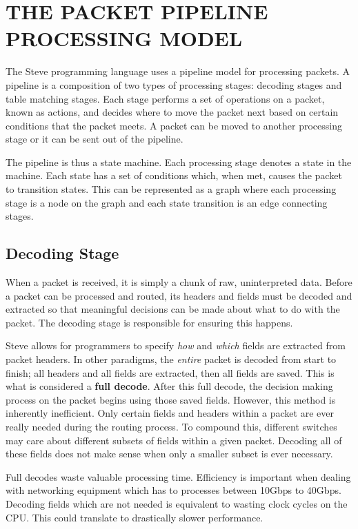 \chapter{THE PACKET PIPELINE PROCESSING MODEL} \label{pipeline_model}

The Steve programming language uses a pipeline model for processing packets. A pipeline is a composition of two types of processing stages: decoding stages and table matching stages. Each stage performs a set of operations on a packet, known as actions, and decides where to move the packet next based on certain conditions that the packet meets. A packet can be moved to another processing stage or it can be sent out of the pipeline.

The pipeline is thus a state machine. Each processing stage denotes a state in the machine. Each state has a set of conditions which, when met, causes the packet to transition states. This can be represented as a graph where each processing stage is a node on the graph and each state transition is an edge connecting stages.

\section{Decoding Stage} \label{decoder_desc}

When a packet is received, it is simply a chunk of raw, uninterpreted data. Before a packet can be processed and routed, its headers and fields must be decoded and extracted so that meaningful decisions can be made about what to do with the packet. The decoding stage is responsible for ensuring this happens.

Steve allows for programmers to specify \textit{how} and \textit{which} fields are extracted from packet headers. In other paradigms, the \textit{entire} packet is decoded from start to finish; all headers and all fields are extracted, then all fields are saved. This is what is considered a \textbf{full decode}. After this full decode, the decision making process on the packet begins using those saved fields. However, this method is inherently inefficient. Only certain fields and headers within a packet are ever really needed during the routing process. To compound this, different switches may care about different subsets of fields within a given packet. Decoding all of these fields does not make sense when only a smaller subset is ever necessary. 

Full decodes waste valuable processing time. Efficiency is important when dealing with networking equipment which has to processes between 10Gbps to 40Gbps. Decoding fields which are not needed is equivalent to wasting clock cycles on the CPU. This could translate to drastically slower performance.

